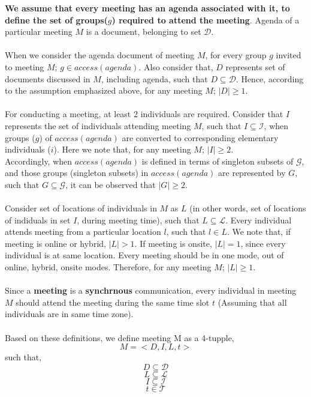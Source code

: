 \documentclass{article}
\begin{document}
\noindent
\textbf{We assume that every meeting has an agenda associated with it, to define the set of groups($g$) required to attend the meeting}. Agenda of a particular meeting $M$ is a document, belonging to set $\mathcal{D}$.\\ \\
When we consider the agenda document of meeting $M$, for every group $g$ invited to meeting $M$; $g \in access(agenda)$. Also consider that, $D$ represents set of documents discussed in $M$, including agenda, such that $D \subseteq \mathcal{D}$. Hence, according to the assumption emphasized above, for any meeting $M$; $|D| \geq 1$.\\ \\ 
For conducting a meeting, at least 2 individuals are required. Consider that $I$ represents the set of individuals attending meeting $M$, such that $I \subseteq \mathcal{I}$, when groups ($g$) of $access(agenda)$ are converted to corresponding elementary individuals ($i$). Here we note that, for any meeting $M$; $|I| \geq 2$.\\
Accordingly, when $access(agenda)$ is defined in terms of singleton subsets of $\mathcal{G}$, and those groups (singleton subsets) in $access(agenda)$ are represented by $G$, such that $G \subseteq \mathcal{G}$, it can be observed that $|G| \geq 2$. \\ \\  
Consider set of locations of individuals in $M$ as $L$ (in other words, set of locations of indiduals in set $I$, during meeting time), such that $L \subseteq \mathcal{L}$. Every individual attends meeting from a particular location $l$, such that $l \in L$. We note that, if meeting is online or hybrid, $|L| > 1$. If meeting is onsite, $|L| = 1$, since every individual is at same location. Every meeting should be in one mode, out of online, hybrid, onsite modes. Therefore, for any meeting $M$; $|L| \geq 1$. \\ \\
Since a \textbf{meeting} is a \textbf{synchrnous} communication, every individual in meeting $M$ should attend the meeting during the same time slot $t$ (Assuming that all individuals are in same time zone).  \\ \\
Based on these definitions, we define meeting M as a 4-tupple,
    \[ M = < D, I, L, t > \]
such that,
    \[ D \subseteq \mathcal{D} \]
    \[ L \subseteq \mathcal{L} \]
    \[ I \subseteq \mathcal{I} \]
    \[ t \in \mathcal{T} \]
\end{document}
